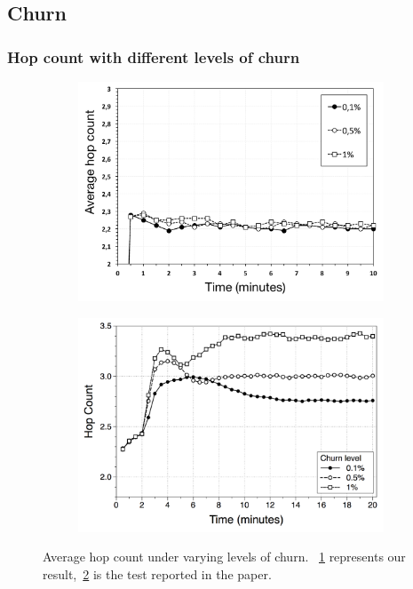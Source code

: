\documentclass{beamer}
\begin{document}
\subsection{Churn}

\begin{frame}
\frametitle{Hop count with different levels of churn}
    
\begin{figure}
\centering
\begin{subfigure}{.5\textwidth}
  \centering
  \includegraphics[keepaspectratio=true, width=1\linewidth]{images/average_hop_count_churn_1impl}
  \caption{}
  \label{fig:average_hop_count_churn_1impl}
\end{subfigure}%
\begin{subfigure}{.5\textwidth}
  \centering
  \includegraphics[keepaspectratio=true, width=1\linewidth]{images/paper_average_hop_count_churn}
  \caption{}
  \label{fig:paper_average_hop_count_churn}
\end{subfigure}
\caption{Average hop count under varying levels of churn. ~\ref{fig:average_hop_count_churn_1impl} represents our result,~\ref{fig:paper_average_hop_count_churn} is the test reported in the paper.}
\label{fig:robustness_hop_count_churn}
\end{figure}

\end{frame}
\end{document}
